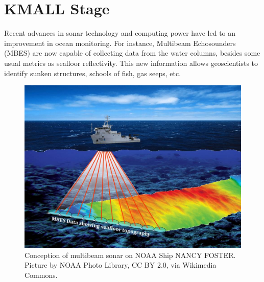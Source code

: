 \chapter{KMALL Stage}

Recent advances in sonar technology and computing power have led to an improvement in ocean monitoring. For instance, Multibeam Echosounders (MBES) are now capable of collecting data from the water columns, besides some usual metrics as seafloor reflectivity. This new information allows geoscientists to identify sunken structures, schools of fish, gas seeps, etc.

\begin{figure}[hb]
	\begin{center}
		\includegraphics[scale=0.45]{images/mbes_ship.jpg}
	\end{center}
	\caption{Conception of multibeam sonar on NOAA Ship NANCY FOSTER. Picture by NOAA Photo Library, CC BY 2.0, via Wikimedia Commons.}
	\label{fig:mbes_ship}
\end{figure}

